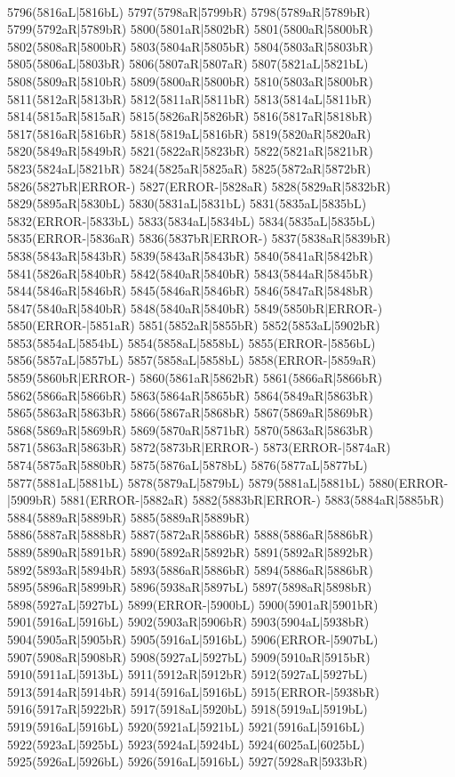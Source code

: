 \\5796(5816aL|5816bL) 5797(5798aR|5799bR) 5798(5789aR|5789bR) 5799(5792aR|5789bR) 5800(5801aR|5802bR) 5801(5800aR|5800bR) 5802(5808aR|5800bR) 5803(5804aR|5805bR) 5804(5803aR|5803bR) \\5805(5806aL|5803bR) 5806(5807aR|5807aR) 5807(5821aL|5821bL) 5808(5809aR|5810bR) 5809(5800aR|5800bR) 5810(5803aR|5800bR) 5811(5812aR|5813bR) 5812(5811aR|5811bR) 5813(5814aL|5811bR) \\5814(5815aR|5815aR) 5815(5826aR|5826bR) 5816(5817aR|5818bR) 5817(5816aR|5816bR) 5818(5819aL|5816bR) 5819(5820aR|5820aR) 5820(5849aR|5849bR) 5821(5822aR|5823bR) 5822(5821aR|5821bR) \\5823(5824aL|5821bR) 5824(5825aR|5825aR) 5825(5872aR|5872bR) 5826(5827bR|ERROR-) 5827(ERROR-|5828aR) 5828(5829aR|5832bR) 5829(5895aR|5830bL) 5830(5831aL|5831bL) 5831(5835aL|5835bL) \\5832(ERROR-|5833bL) 5833(5834aL|5834bL) 5834(5835aL|5835bL) 5835(ERROR-|5836aR) 5836(5837bR|ERROR-) 5837(5838aR|5839bR) 5838(5843aR|5843bR) 5839(5843aR|5843bR) 5840(5841aR|5842bR) \\5841(5826aR|5840bR) 5842(5840aR|5840bR) 5843(5844aR|5845bR) 5844(5846aR|5846bR) 5845(5846aR|5846bR) 5846(5847aR|5848bR) 5847(5840aR|5840bR) 5848(5840aR|5840bR) 5849(5850bR|ERROR-) \\5850(ERROR-|5851aR) 5851(5852aR|5855bR) 5852(5853aL|5902bR) 5853(5854aL|5854bL) 5854(5858aL|5858bL) 5855(ERROR-|5856bL) 5856(5857aL|5857bL) 5857(5858aL|5858bL) 5858(ERROR-|5859aR) \\5859(5860bR|ERROR-) 5860(5861aR|5862bR) 5861(5866aR|5866bR) 5862(5866aR|5866bR) 5863(5864aR|5865bR) 5864(5849aR|5863bR) 5865(5863aR|5863bR) 5866(5867aR|5868bR) 5867(5869aR|5869bR) \\5868(5869aR|5869bR) 5869(5870aR|5871bR) 5870(5863aR|5863bR) 5871(5863aR|5863bR) 5872(5873bR|ERROR-) 5873(ERROR-|5874aR) 5874(5875aR|5880bR) 5875(5876aL|5878bL) 5876(5877aL|5877bL) \\5877(5881aL|5881bL) 5878(5879aL|5879bL) 5879(5881aL|5881bL) 5880(ERROR-|5909bR) 5881(ERROR-|5882aR) 5882(5883bR|ERROR-) 5883(5884aR|5885bR) 5884(5889aR|5889bR) 5885(5889aR|5889bR) \\5886(5887aR|5888bR) 5887(5872aR|5886bR) 5888(5886aR|5886bR) 5889(5890aR|5891bR) 5890(5892aR|5892bR) 5891(5892aR|5892bR) 5892(5893aR|5894bR) 5893(5886aR|5886bR) 5894(5886aR|5886bR) \\5895(5896aR|5899bR) 5896(5938aR|5897bL) 5897(5898aR|5898bR) 5898(5927aL|5927bL) 5899(ERROR-|5900bL) 5900(5901aR|5901bR) 5901(5916aL|5916bL) 5902(5903aR|5906bR) 5903(5904aL|5938bR) \\5904(5905aR|5905bR) 5905(5916aL|5916bL) 5906(ERROR-|5907bL) 5907(5908aR|5908bR) 5908(5927aL|5927bL) 5909(5910aR|5915bR) 5910(5911aL|5913bL) 5911(5912aR|5912bR) 5912(5927aL|5927bL) \\5913(5914aR|5914bR) 5914(5916aL|5916bL) 5915(ERROR-|5938bR) 5916(5917aR|5922bR) 5917(5918aL|5920bL) 5918(5919aL|5919bL) 5919(5916aL|5916bL) 5920(5921aL|5921bL) 5921(5916aL|5916bL) \\5922(5923aL|5925bL) 5923(5924aL|5924bL) 5924(6025aL|6025bL) 5925(5926aL|5926bL) 5926(5916aL|5916bL) 5927(5928aR|5933bR) 
